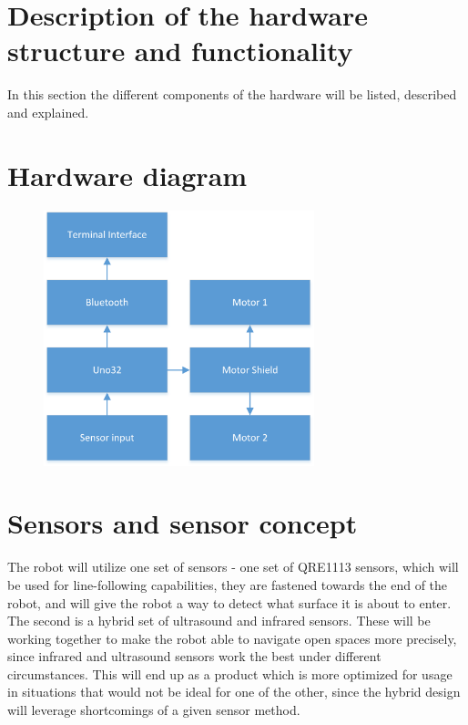 \section{Description of the hardware structure and functionality}
 
In this section the different components of the hardware will be listed, described and explained.\


\section{Hardware diagram}
\begin{figure}[!ht]
	\centering
	\includegraphics[width=0.7\textwidth]{figures/UdklipDIA2.png}
	\caption{}
	\label{Hardware diagram}
\end{figure}


\section{Sensors and sensor concept}
The robot will utilize one set of sensors - one set of QRE1113 sensors, which will be used for line-following capabilities, they are fastened towards the end of the robot, and will give the robot a way to detect what surface it is about to enter.\\
The second is a hybrid set of ultrasound and infrared sensors. These will be working together to make the robot able to navigate open spaces more precisely, since infrared and ultrasound sensors work the best under different circumstances. This will end up as a product which is more optimized for usage in situations that would not be ideal for one of the other, since the hybrid design will leverage shortcomings of a given sensor method.\\

